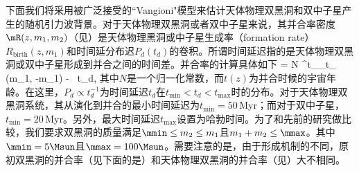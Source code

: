 下面我们将采用被广泛接受的``Vangioni"模型\citep{Dvorkin:2016wac}来估计天体物理双黑洞和双中子星产生的随机引力波背景。对于天体物理双黑洞或者双中子星来说，其并合率密度$\mR(z,m_{1},m_{2})$（见）是天体物理黑洞或中子星生成率（formation rate）$R_{\mathrm{birth}}(z,m_{1})$和时间延分布迟$P_{d} \left(t_{d} \right)$的卷积。所谓时间延迟指的是天体物理双黑洞或双中子星形成到并合之间的时间差。并合率的计算具体如下
\e\label{sBHR1}
\mR= N \int^{t_{}}_{t_{}}  
{\min(m_1, \mmax-m_1) - \mmin}\ \rmd t_d,
\q
其中$N$是一个归一化常数，而$t(z)$为并合时候的宇宙年龄。在这里，$P_{d} \propto t_{d}^{-1}$为时间延迟$t_{d}$在$t_{\mathrm{min}} < t_{d} < t_{\mathrm{max}}$时的分布\citep{Abbott:2017xzg}。对于天体物理双黑洞系统，其从演化到并合的最小时间延迟为$t_{\mathrm{min}} = 50$\,Myr；而对于双中子星，$t_{\mathrm{min}} = 20$\,Myr。另外，最大时间延迟$t_{\mathrm{max}}$设置为哈勃时间。为了和先前的研究\citep{Abbott:2017vtc,Abbott:2017xzg}做比较，我们要求双黑洞的质量满足$\mmin \leq m_2 \leq m_1$且$m_1 + m_2 \leq \mmax$。其中$ \mmin = 5\Msun$且$\mmax = 100\Msun$。需要注意的是，由于形成机制的不同，原初双黑洞的并合率（见下面的是）和天体物理双黑洞的并合率（见）大不相同。


